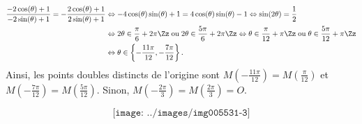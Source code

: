 {{\begin{align*}\ensuremath
\frac{-2\cos(\theta)+1}{-2\sin(\theta)+1}=-\frac{2\cos(\theta)+1}{2\sin(\theta)+1}&\Leftrightarrow-4\cos(\theta)\sin(\theta)+1=4\cos(\theta
)\sin(\theta)-1\Leftrightarrow\sin(2\theta)=\frac{1}{2}\\
 &\Leftrightarrow2\theta\in\frac{\pi}{6}+2\pi\Zz\;\text{ou}\;2\theta\in\frac{5\pi}{6}+2\pi\Zz\Leftrightarrow\theta\in\frac{\pi}{12}+\pi\Zz\;\text{ou}\;\theta\in\frac{5\pi}{12}+\pi\Zz\\
 &\Leftrightarrow\theta\in\left\{-\frac{11\pi}{12},-\frac{7\pi}{12}\right\}.
\end{align*}
Ainsi, les points doubles distincts de l'origine sont $M\left(-\frac{11\pi}{12}\right)=M\left(\frac{\pi}{12}\right)$ et $M\left(-\frac{7\pi}{12}\right)=M\left(\frac{5\pi}{12}\right)$. Sinon, $M\left(-\frac{2\pi}{3}\right)=M\left(\frac{2\pi}{3}\right)=O$.

$$\texttt{[image: ../images/img005531-3]}$$}
}